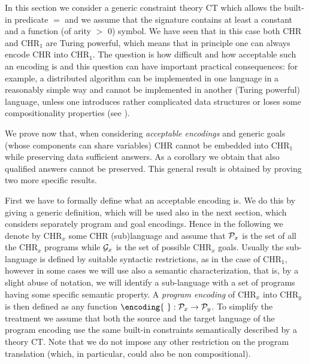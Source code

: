 



In this section we consider a generic constraint theory CT  which allows the built-in predicate $=$ and we assume that the signature contains at least a constant and a function (of arity $ >$ 0) symbol. We have seen that in this case both CHR and CHR$_1$ are Turing powerful, which means that in principle one can always encode CHR into CHR$_1$. The question is how difficult and how acceptable such an encoding is and this question can have important practical consequences: for example, a distributed algorithm can be implemented in one language in a reasonably simple way and cannot be implemented in another (Turing powerful) language, unless one introduces rather complicated data structures or loses some compositionality properties (see \cite{VPP07}).


We prove now that, when considering \emph{acceptable encodings} and generic goals (whose components can share variables) CHR cannot be embedded into CHR$_1$  while preserving data sufficient answers. As a corollary we obtain that also qualified answers cannot be preserved. This general result is obtained by proving two more specific results.

First we have to formally define what an acceptable encoding is. We do this by giving a generic definition, which will be used also in the next section, which considers separately program and goal encodings. Hence in the following we denote by CHR$_x$ some CHR (sub)language and assume that ${\cal P}_{x}$ is the set of all the CHR$_x$ programs while ${\cal G}_{x}$ is the set of possible CHR$_x$ goals. Usually the sub-language is defined by suitable syntactic restrictions, as in the case of CHR$_1$, however in some cases we will use also a semantic characterization, that is, by a slight abuse of notation, we will identify a sub-language with a set of programs having some specific semantic property.
A  \emph{program encoding} of CHR$_x$ into CHR$_y$ is then defined as any  function $\encoding{\ }:{\cal P}_{x} \rightarrow {\cal P}_{y}$. To simplify the treatment we assume that both the source and the target language of the program encoding use the same built-in constraints semantically described by a theory CT. Note that we do not impose any other restriction on the program translation (which, in particular, could also be non compositional).

